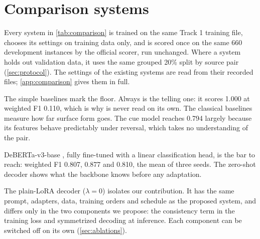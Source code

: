 \section{Comparison systems}
\label{sec:comparison}

Every system in \cref{tab:comparison} is trained on the same Track 1 training file, chooses its settings on training data only, and is scored once on the same 660 development instances by the official scorer, run unchanged. Where a system holds out validation data, it uses the same grouped 20\% split by source pair (\cref{sec:protocol}). The settings of the existing systems are read from their recorded  files; \cref{app:comparison} gives them in full.


The simple baselines mark the floor. Always \EQ{} is the telling one: it scores \SoftCons{} 1.000 at weighted F1 0.110, which is why \SoftCons{} is never read on its own. The classical baselines measure how far surface form goes. The cue model reaches \SoftCons{} 0.794 largely because its features behave predictably under reversal, which takes no understanding of the pair.

DeBERTa-v3-base \citep{he-etal-2023-debertav3}, fully fine-tuned with a linear classification head, is the bar to reach: weighted F1 0.807, \SoftCons{} 0.877 and \HardCons{} 0.810, the mean of three seeds. The zero-shot decoder shows what the backbone knows before any adaptation.

The plain-LoRA decoder ($\lambda = 0$) isolates our contribution. It has the same prompt, adapters, data, training orders and schedule as the proposed system, and differs only in the two components we propose: the consistency term in the training loss and symmetrized decoding at inference. Each component can be switched off on its own (\cref{sec:ablations}).
